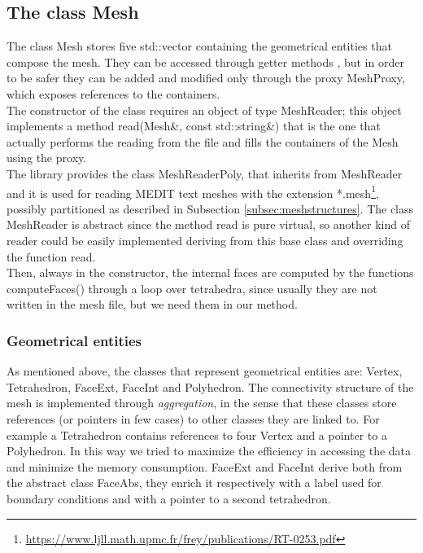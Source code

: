 \documentclass[12pt, a4paper]{article}
\newcommand{\code}[1]{{\footnotesize\ttfamily #1}}
\theoremstyle{definition}
\theoremstyle{plain}
\theoremstyle{plain}
\theoremstyle{definition}
\begin{document}
\subsection{The class Mesh}

The class \code{Mesh} stores five \code{std::vector} containing the geometrical entities that compose the mesh. They can be accessed through getter methods , but in order to be safer they can be added and modified only through the proxy \code{MeshProxy}, which exposes references to the containers.\\
The constructor of the class requires an object of type \code{MeshReader}; this object implements a 
method \code{read(Mesh\&, const std::string\&)} that is the one that actually 
performs the reading from the file and fills the containers of the \code{Mesh} 
using the proxy.\\ The library provides the class \code{MeshReaderPoly}, that 
inherits from \code{MeshReader} and it is used for reading MEDIT text meshes 
with the extension 
*.mesh\footnote{\url{https://www.ljll.math.upmc.fr/frey/publications/RT-0253.pdf}},
 possibly partitioned as described in Subsection \ref{subsec:meshstructures}. 
The class \code{MeshReader} is abstract since the method \code{read} is pure 
virtual, so another kind of reader could be easily implemented deriving from 
this base class and overriding the function \code{read}.\\
Then, always in the constructor, the internal faces are computed by the functions \code{computeFaces()} through a loop over tetrahedra, since usually they are not written in the mesh file, but we need them in our method.\\
\subsubsection{Geometrical entities}
As mentioned above, the classes that represent geometrical entities are: 
\code{Vertex}, \code{Tetrahedron}, \code{FaceExt}, \code{FaceInt} and 
\code{Polyhedron}. The connectivity structure of the mesh is implemented 
through \emph{aggregation}, in the sense that these classes store references 
(or pointers in few cases) to other classes they are linked to. For example a 
\code{Tetrahedron} contains references to four \code{Vertex} and a pointer to a 
\code{Polyhedron}. In this way we tried to maximize the efficiency in accessing 
the data and minimize the memory consumption. \code{FaceExt} and \code{FaceInt} 
derive both from the abstract class \code{FaceAbs}, they enrich it respectively 
with a label used for boundary conditions and with a pointer to a second 
tetrahedron.
\end{document}
